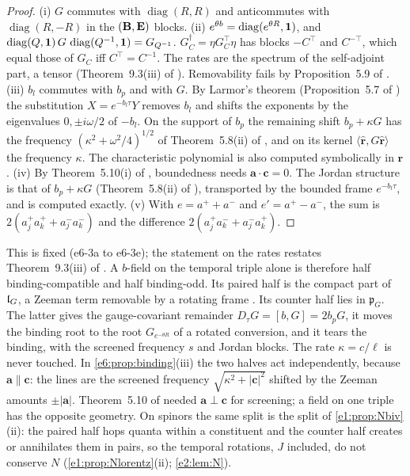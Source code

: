 \begin{proof}
(i) $G$ commutes with $\operatorname{diag}(R,R)$ and anticommutes with $\operatorname{diag}(R,-R)$ in the $(\mathbf B,\mathbf E)$ blocks. (ii)
$e^{\theta b}=\operatorname{diag}(e^{\theta R},\mathbf 1)$, and $\operatorname{diag}(Q,\mathbf 1)\,G\,\operatorname{diag}(Q^{-1},\mathbf 1)=G_{Q^{-1}}$. $G_C^\dagger=\eta G_C^{\!\top}\eta$ has blocks $-C^{\!\top}$ and
$C^{-\top}$, which equal those of $G_C$ iff $C^{\!\top}=C^{-1}$. The rates are the spectrum of the self-adjoint part, a tensor (Theorem~9.3(iii) of
\cite{RE}). Removability fails by Proposition~5.9 of \cite{RE}. (iii) $b_l$ commutes with $b_p$ and with $G$. By Larmor's theorem (Proposition~5.7 of
\cite{RE}) the substitution $X=e^{-b_l\tau}Y$ removes $b_l$ and shifts the exponents by the eigenvalues $0,\pm i\omega/2$ of $-b_l$. On the support of $b_p$ the
remaining shift $b_p+\kappa G$ has the frequency $(\kappa^2+\omega^2/4)^{1/2}$ of Theorem~5.8(ii) of \cite{RE}, and on its kernel $\langle\hat{\mathbf r},G\hat{\mathbf r}\rangle$ the
frequency $\kappa$. The characteristic polynomial is also computed symbolically in $\mathbf r$. (iv) By Theorem~5.10(i) of \cite{RE}, boundedness needs
$\mathbf a\cdot\mathbf c=0$. The Jordan structure is that of $b_p+\kappa G$ (Theorem~5.8(ii) of \cite{RE}), transported by the bounded frame $e^{-b_l\tau}$, and is
computed exactly. (v) With $e=a^++a^-$ and $e'=a^+-a^-$, the sum is $2(a^+_ja^+_k+a^-_ja^-_k)$ and the difference $2(a^+_ja^-_k+a^-_ja^+_k)$.
\end{proof}

This is fixed (e6-3a to e6-3e); the statement on the rates restates Theorem~9.3(iii) of \cite{RE}. A $b$-field on the temporal triple alone is
therefore half binding-compatible and half binding-odd. Its paired half is the compact part of $\mathfrak l_G$, a Zeeman term removable by a rotating frame
\cite{Larmor1897}. Its counter half lies in $\mathfrak p_G$. The latter gives the gauge-covariant remainder $D_\tau G=[b,G]=2b_pG$, it moves the binding root
to the root $G_{e^{-\theta R}}$ of a rotated conversion, and it tears the binding, with the screened frequency $s$ and Jordan blocks. The rate
$\kappa=c/\ell$ is never touched. In \cref{e6:prop:binding}(iii) the two halves act independently, because $\mathbf a\parallel\mathbf c$: the lines are
the screened frequency $\sqrt{\kappa^2+|\mathbf c|^2}$ shifted by the Zeeman amounts $\pm|\mathbf a|$. Theorem~5.10 of \cite{RE} needed
$\mathbf a\perp\mathbf c$ for screening; a field on one triple has the opposite geometry. On spinors the same split is the split of
\cref{e1:prop:Nbiv}(ii): the paired half hops quanta within a constituent and the counter half creates or annihilates them in pairs, so the
temporal rotations, $J$ included, do not conserve $N$ (\cref{e1:prop:Nlorentz}(ii); \cref{e2:lem:N}).

